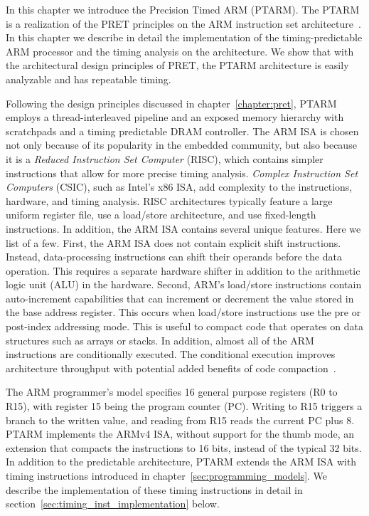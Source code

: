 In this chapter we introduce the Precision Timed ARM (PTARM).
The PTARM is a realization of the PRET principles on the ARM instruction set architecture~\cite{armrefman}. 
In this chapter we describe in detail the implementation of the timing-predictable ARM processor and the timing analysis on the architecture.
We show that with the architectural design principles of PRET, the PTARM architecture is easily analyzable and has repeatable timing.
  
Following the design principles discussed in chapter~\ref{chapter:pret}, PTARM employs a thread-interleaved pipeline and an exposed memory hierarchy with scratchpads and a timing predictable DRAM controller.
The ARM ISA is chosen not only because of its popularity in the embedded community, but also because it is a \emph{Reduced Instruction Set Computer} (RISC), which contains simpler instructions that allow for more precise timing analysis. 
\emph{Complex Instruction Set Computers} (CSIC), such as Intel's x86 ISA, add complexity to the instructions, hardware, and timing analysis.
RISC architectures typically feature a large uniform register file, use a load/store architecture, and use fixed-length instructions.
In addition, the ARM ISA contains several unique features. 
Here we list of a few.  
First, the ARM ISA does not contain explicit shift instructions.
Instead, data-processing instructions can shift their operands before the data operation. 
This requires a separate hardware shifter in addition to the arithmetic logic unit (ALU) in the hardware.  
Second, ARM's load/store instructions contain auto-increment capabilities that can increment or decrement the value stored in the base address register.
This occurs when load/store instructions use the pre or post-index addressing mode.   
This is useful to compact code that operates on data structures such as arrays or stacks. 
In addition, almost all of the ARM instructions are conditionally executed.
The conditional execution improves architecture throughput with potential added benefits of code compaction~\cite{cheung_code_compact_pred03}.     

The ARM programmer's model specifies 16 general purpose registers (R0 to R15), with register 15 being the program counter (PC). 
Writing to R15 triggers a branch to the written value, and reading from R15 reads the current PC plus 8.
PTARM implements the ARMv4 ISA, without support for the thumb mode, an extension that compacts the instructions to 16 bits, instead of the typical 32 bits. 
In addition to the predictable architecture, PTARM extends the ARM ISA with timing instructions introduced in chapter~\ref{sec:programming_models}.
We describe the implementation of these timing instructions in detail in section~\ref{sec:timing_inst_implementation} below.    

